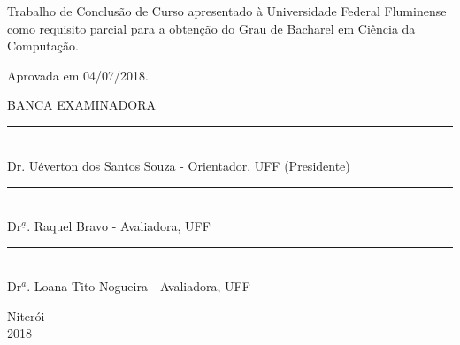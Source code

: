 \noindent
\begin{flushright}
\begin{minipage}[t]{8cm}

Trabalho de Conclusão de Curso apresentado à Universidade Federal Fluminense como requisito parcial para a obtenção do Grau
de Bacharel em Ciência da Computação.

\end{minipage}
\end{flushright}
\vspace{1.0 cm}
\noindent
Aprovada em 04/07/2018. \\ 
\begin{flushright}
\end{flushright}
\parbox{11cm}
{
 \begin{center}
BANCA EXAMINADORA \\
  \vspace{4mm}
  \rule{11cm}{.1mm} \\
    Dr. Uéverton dos Santos Souza - Orientador, UFF (Presidente)\\
    \vspace{4mm}
  \rule{11cm}{.1mm} \\
    Dr$^{\underline{a}}$. Raquel Bravo - Avaliadora, UFF\\
    \vspace{4mm}
  \rule{11cm}{.1mm} \\
    Dr$^{\underline{a}}$. Loana Tito Nogueira - Avaliadora, UFF\\
    \vspace{4mm}
  \end{center}
  }
\begin{center}
  \vspace{6mm}
  Niterói \\
  \vspace{6mm}
  2018
\end{center}





